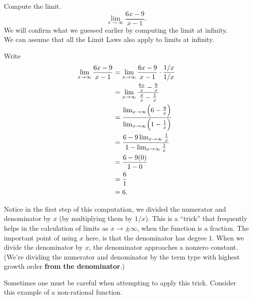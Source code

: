 \documentclass{ximera}
\begin{document}
\begin{example}  Compute the limit.
\[
\lim_{x\to\infty} \frac{6x-9}{x-1}.
\]
We will confirm what we guessed earlier by computing the limit at infinity.\\
 We can assume that all the Limit Laws also apply to limits at infinity.
\begin{explanation}
Write
\begin{align*}
\lim_{x\to\infty}\frac{6x-9}{x-1} &= \lim_{x\to\infty}\frac{6x-9}{x-1}\cdot \frac{1/x}{1/x}\\
&=\lim_{x\to\infty}\frac{\frac{6x}{x} - \frac{9}{x}}{\frac{x}{x} - \frac{1}{x}}\\
&=\frac{\lim_{x\to\infty}\Bigl(6- \frac{9}{x}\Bigr)}{\lim_{x\to\infty}\Bigl(1- \frac{1}{x}\Bigr)}\\
&=\frac{6-9\lim_{x\to\infty}  \frac{1}{x}}{1-\lim_{x\to\infty} \frac{1}{x}}\\
&=\frac{6-9(0)}{1-0}\\
&=  \frac{6}{1}\\
&= 6.
\end{align*}
\end{explanation}
\end{example}

Notice in the first step of this computation, we divided the numerator and denominator by $x$ (by multiplying them by $1/x$). This is a ``trick''
that frequently helps in the calculation of limits as $x\to \pm \infty$, when the function is a fraction. The important point of using $x$ here, is that the
denominator has degree $1$. When we divide the denominator by $x$, the denominator approaches a nonzero constant. 
(We're dividing the numerator and denominator by the term type with highest growth order \textbf{from the denominator}.)

Sometimes one must be careful when attempting to apply this trick. Consider this example of a non-rational function.
\end{document}
